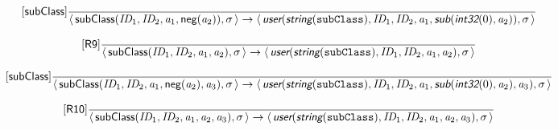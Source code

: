\documentclass[10pt,leqno]{article}
\newcommand{\artVariable}[1]{\mbox{\em #1\/}}
\newcommand{\artConstructor}[1]{\mbox{\sf #1}}
\newcommand{\artCaseInsensitiveLiteral}[1]{\mbox{\tt #1}}
\newcommand{\artSpecial}[1]{\mbox{\sf\em #1}}
\begin{document}
\begin{equation}
\tag*{[\artConstructor{\sf subClass}]}\frac{}{\langle\, \artConstructor{\sf subClass}(\artVariable{ID$_{1}$}, \artVariable{ID$_{2}$}, \artVariable{a$_{1}$}, \artConstructor{\sf neg}(\artVariable{a$_{2}$})), \artVariable{$\sigma$}\,\rangle \rightarrow \langle\, \artSpecial{user}(\artSpecial{string}(\artCaseInsensitiveLiteral{subClass}), \artVariable{ID$_{1}$}, \artVariable{ID$_{2}$}, \artVariable{a$_{1}$}, \artSpecial{sub}(\artSpecial{int32}(0), \artVariable{a$_{2}$})), \artVariable{$\sigma$}\,\rangle }
\end{equation}

\begin{equation}
\tag*{[\artConstructor{\sf R9}]}\frac{}{\langle\, \artConstructor{\sf subClass}(\artVariable{ID$_{1}$}, \artVariable{ID$_{2}$}, \artVariable{a$_{1}$}, \artVariable{a$_{2}$}), \artVariable{$\sigma$}\,\rangle \rightarrow \langle\, \artSpecial{user}(\artSpecial{string}(\artCaseInsensitiveLiteral{subClass}), \artVariable{ID$_{1}$}, \artVariable{ID$_{2}$}, \artVariable{a$_{1}$}, \artVariable{a$_{2}$}), \artVariable{$\sigma$}\,\rangle }
\end{equation}

\begin{equation}
\tag*{[\artConstructor{\sf subClass}]}\frac{}{\langle\, \artConstructor{\sf subClass}(\artVariable{ID$_{1}$}, \artVariable{ID$_{2}$}, \artVariable{a$_{1}$}, \artConstructor{\sf neg}(\artVariable{a$_{2}$}), \artVariable{a$_{3}$}), \artVariable{$\sigma$}\,\rangle \rightarrow \langle\, \artSpecial{user}(\artSpecial{string}(\artCaseInsensitiveLiteral{subClass}), \artVariable{ID$_{1}$}, \artVariable{ID$_{2}$}, \artVariable{a$_{1}$}, \artSpecial{sub}(\artSpecial{int32}(0), \artVariable{a$_{2}$}), \artVariable{a$_{3}$}), \artVariable{$\sigma$}\,\rangle }
\end{equation}

\begin{equation}
\tag*{[\artConstructor{\sf R10}]}\frac{}{\langle\, \artConstructor{\sf subClass}(\artVariable{ID$_{1}$}, \artVariable{ID$_{2}$}, \artVariable{a$_{1}$}, \artVariable{a$_{2}$}, \artVariable{a$_{3}$}), \artVariable{$\sigma$}\,\rangle \rightarrow \langle\, \artSpecial{user}(\artSpecial{string}(\artCaseInsensitiveLiteral{subClass}), \artVariable{ID$_{1}$}, \artVariable{ID$_{2}$}, \artVariable{a$_{1}$}, \artVariable{a$_{2}$}, \artVariable{a$_{3}$}), \artVariable{$\sigma$}\,\rangle }
\end{equation}
\end{document}
